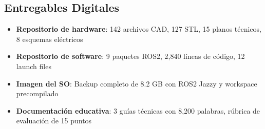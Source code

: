 \subsection{Entregables Digitales}

\begin{itemize}
    \item \textbf{Repositorio de hardware}: 142 archivos CAD, 127 STL, 15 planos técnicos, 8 esquemas eléctricos
    \item \textbf{Repositorio de software}: 9 paquetes ROS2, 2,840 líneas de código, 12 launch files
    \item \textbf{Imagen del SO}: Backup completo de 8.2 GB con ROS2 Jazzy y workspace precompilado
    \item \textbf{Documentación educativa}: 3 guías técnicas con 8,200 palabras, rúbrica de evaluación de 15 puntos
\end{itemize}